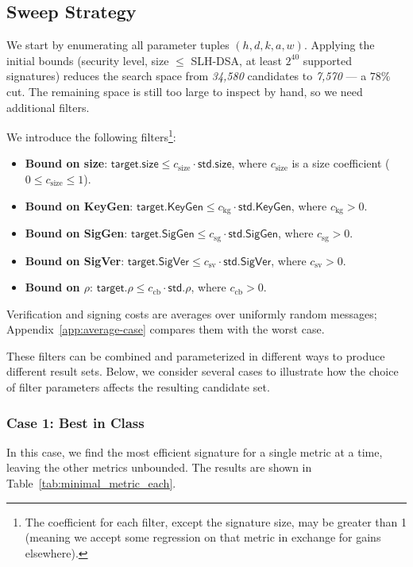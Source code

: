 \subsection{Sweep Strategy} \label{sec:sweep-strategy}
We start by enumerating all parameter tuples $(h, d, k, a, w)$. Applying the initial bounds (security level, size $\leq$ SLH-DSA, at least $2^{40}$ supported signatures) reduces the search space from \emph{34,580} candidates to \emph{7,570} — a $78\%$ cut. The remaining space is still too large to inspect by hand, so we need additional filters.

We introduce the following filters\footnote{The coefficient for each filter, except the signature size, may be greater than 1 (meaning we accept some regression on that metric in exchange for gains elsewhere).}:

\begin{itemize}
    \item \textbf{Bound on size}: $\mathsf{target.size} \leq c_{\text{size}} \cdot \mathsf{std.size}$, where $c_{\text{size}}$ is a size coefficient ($0 \leq c_{\text{size}} \leq 1$).
    \item \textbf{Bound on KeyGen}: $\mathsf{target.KeyGen} \leq c_{\text{kg}} \cdot \mathsf{std.KeyGen}$, where $c_{\text{kg}} > 0$.
    \item \textbf{Bound on SigGen}: $\mathsf{target.SigGen} \leq c_{\text{sg}} \cdot \mathsf{std.SigGen}$, where $c_{\text{sg}} > 0$.
    \item \textbf{Bound on SigVer}: $\mathsf{target.SigVer} \leq c_{\text{sv}} \cdot \mathsf{std.SigVer}$, where $c_{\text{sv}} > 0$.
    \item \textbf{Bound on $\rho$}: $\mathsf{target}.\rho \leq c_{\text{cb}} \cdot \mathsf{std}.\rho$, where $c_{\text{cb}} > 0$.
\end{itemize}

Verification and signing costs are averages over uniformly random messages; Appendix~\ref{app:average-case} compares them with the worst case.


These filters can be combined and parameterized in different ways to produce different result sets. Below, we consider several cases to illustrate how the choice of filter parameters affects the resulting candidate set.

\subsubsection{Case 1: Best in Class}
In this case, we find the most efficient signature for a single metric at a time, leaving the other metrics unbounded. The results are shown in Table~\ref{tab:minimal_metric_each}.

